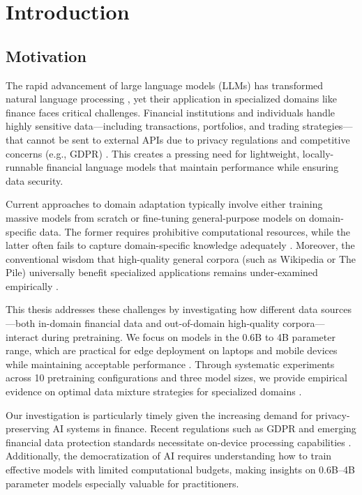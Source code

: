 \chapter{Introduction}

\section{Motivation}

The rapid advancement of large language models (LLMs) has transformed natural language processing \parencite{vaswani2017attention,radford2019language,brown2020language,touvron2023llama}, yet their application in specialized domains like finance faces critical challenges. Financial institutions and individuals handle highly sensitive data—including transactions, portfolios, and trading strategies—that cannot be sent to external APIs due to privacy regulations and competitive concerns (e.g., GDPR) \parencite{eu2016gdpr}. This creates a pressing need for lightweight, locally-runnable financial language models that maintain performance while ensuring data security.

Current approaches to domain adaptation typically involve either training massive models from scratch or fine-tuning general-purpose models on domain-specific data. The former requires prohibitive computational resources, while the latter often fails to capture domain-specific knowledge adequately \parencite{gururangan2020don}. Moreover, the conventional wisdom that high-quality general corpora (such as Wikipedia or The Pile) universally benefit specialized applications remains under-examined empirically \parencite{gao2020pile,raffel2020exploring,longpre2023pretrainer}.

This thesis addresses these challenges by investigating how different data sources—both in-domain financial data and out-of-domain high-quality corpora—interact during pretraining. We focus on models in the 0.6B to 4B parameter range, which are practical for edge deployment on laptops and mobile devices while maintaining acceptable performance \parencite{yang2024qwen2,xia2023sheared}. Through systematic experiments across 10 pretraining configurations and three model sizes, we provide empirical evidence on optimal data mixture strategies for specialized domains \parencite{wu2023bloomberggpt}.

Our investigation is particularly timely given the increasing demand for privacy-preserving AI systems in finance. Recent regulations such as GDPR and emerging financial data protection standards necessitate on-device processing capabilities \parencite{eu2016gdpr}. Additionally, the democratization of AI requires understanding how to train effective models with limited computational budgets, making insights on 0.6B--4B parameter models especially valuable for practitioners.

